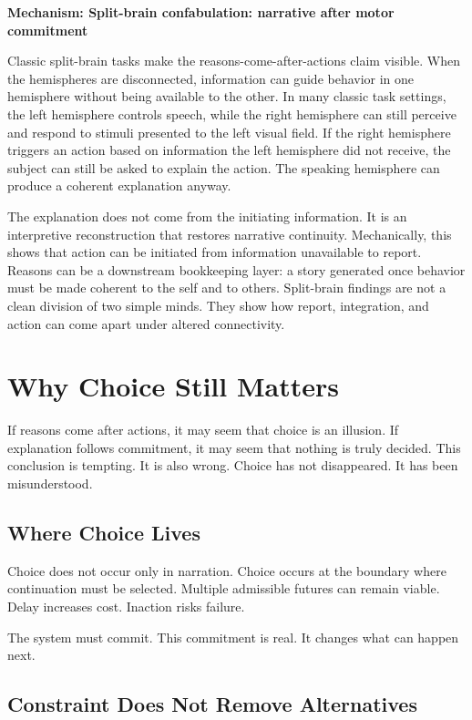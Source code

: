\documentclass[11pt,twoside,openright]{book}
\newenvironment{mechanismbox}[1]
  {\begin{framed}\noindent\textbf{Mechanism: #1}\par\medskip}
  {\end{framed}}
\begin{document}
\begin{mechanismbox}{Split-brain confabulation: narrative after motor commitment}

Classic split-brain tasks make the reasons-come-after-actions claim visible. When the hemispheres are disconnected, information can guide behavior in one hemisphere without being available to the other. In many classic task settings, the left hemisphere controls speech, while the right hemisphere can still perceive and respond to stimuli presented to the left visual field. If the right hemisphere triggers an action based on information the left hemisphere did not receive, the subject can still be asked to explain the action. The speaking hemisphere can produce a coherent explanation anyway.

The explanation does not come from the initiating information. It is an interpretive reconstruction that restores narrative continuity. Mechanically, this shows that action can be initiated from information unavailable to report. Reasons can be a downstream bookkeeping layer: a story generated once behavior must be made coherent to the self and to others. Split-brain findings are not a clean division of two simple minds. They show how report, integration, and action can come apart under altered connectivity.

\end{mechanismbox}
\chapter{Why Choice Still Matters}
\label{ch:choice_still_matters}

If reasons come after actions, it may seem that choice is an illusion. If explanation follows commitment, it may seem that nothing is truly decided. This conclusion is tempting. It is also wrong. Choice has not disappeared. It has been misunderstood.

\section*{Where Choice Lives}

Choice does not occur only in narration. Choice occurs at the boundary where continuation must be selected. Multiple admissible futures can remain viable. Delay increases cost. Inaction risks failure.

The system must commit. This commitment is real. It changes what can happen next.

\section*{Constraint Does Not Remove Alternatives}
\end{document}

